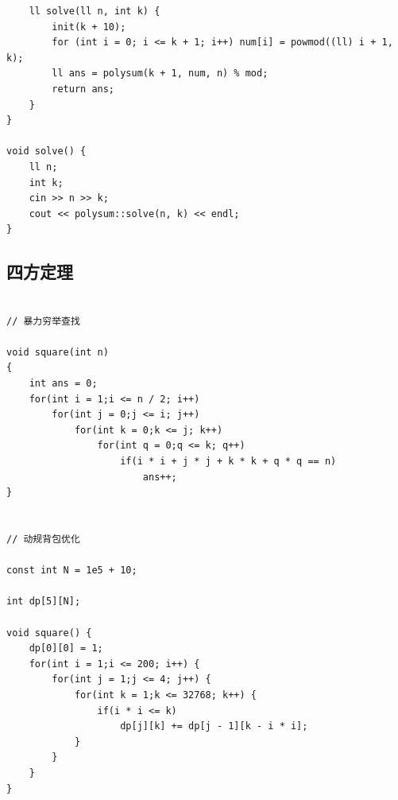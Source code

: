 \documentclass[twoside]{article}
\begin{document}
\begin{lstlisting}
    ll solve(ll n, int k) {
        init(k + 10);
        for (int i = 0; i <= k + 1; i++) num[i] = powmod((ll) i + 1, k);
        ll ans = polysum(k + 1, num, n) % mod;
        return ans;
    }
}

void solve() {
    ll n;
    int k;
    cin >> n >> k;
    cout << polysum::solve(n, k) << endl;
}
\end{lstlisting}
\subsection{四方定理}
\begin{lstlisting}

// 暴力穷举查找

void square(int n)
{
    int ans = 0;
    for(int i = 1;i <= n / 2; i++)
        for(int j = 0;j <= i; j++)
            for(int k = 0;k <= j; k++)
                for(int q = 0;q <= k; q++)
                    if(i * i + j * j + k * k + q * q == n)
                        ans++;
}


// 动规背包优化

const int N = 1e5 + 10;

int dp[5][N];

void square() {
    dp[0][0] = 1;
    for(int i = 1;i <= 200; i++) {
        for(int j = 1;j <= 4; j++) {
            for(int k = 1;k <= 32768; k++) {
                if(i * i <= k)
                    dp[j][k] += dp[j - 1][k - i * i];
            }
        }
    }
}\end{lstlisting}
\end{document}
